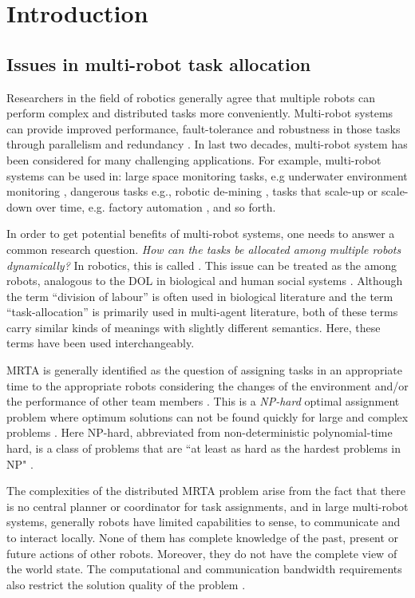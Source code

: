 \chapter{Introduction}
\label{intro}
\section{Issues in multi-robot task allocation}
\label{intro:mrta}
Researchers in the field of robotics generally agree that multiple robots can perform complex and distributed tasks more conveniently. Multi-robot systems can provide improved performance, fault-tolerance and robustness in those tasks through parallelism and redundancy \cite{Arkin1998,Parker+2006}. In last two decades, multi-robot system has been considered for many challenging applications. For example, multi-robot systems can be used in: large space monitoring tasks, e.g underwater environment monitoring \cite{Eriksen+2001}, dangerous tasks e.g., robotic de-mining \cite{Dunbar+2002}, tasks that scale-up or scale-down over time, e.g. factory automation \cite{Wurman+2008}, and so forth.

In order to get potential benefits of multi-robot systems,  one needs to answer a common research question. \textit{How can the tasks be allocated among multiple robots dynamically?} In robotics, this is called  \cite{Gerkey+2004}. This issue can be treated as the  among robots, analogous to the DOL in biological and human social systems \cite{Sendova-Franks+1999}. Although the term ``division of labour'' is often used in biological literature and the term ``task-allocation'' is primarily used in multi-agent literature, both of these terms carry similar kinds of meanings with slightly different semantics. Here, these terms have been used interchangeably.

MRTA is generally identified as the question of assigning tasks in an appropriate time to the appropriate robots considering the changes of the environment and/or the performance of other team members \cite{Gerkey+2003}. This is a {\em NP-hard} optimal assignment problem where optimum solutions can not be found quickly for large and complex problems \cite{Parker2008}. Here NP-hard, abbreviated from non-deterministic polynomial-time hard,  is a class of problems that are ``at least as hard as the hardest problems in NP" \cite{garey1979computers}.

The complexities of the distributed MRTA problem arise from the fact that there is no central planner or coordinator for task assignments, and in large multi-robot systems, generally robots have limited capabilities to sense, to communicate and to interact locally. None of them has complete knowledge of the past, present or future actions of other robots. Moreover, they do not have the complete view of the world state. The computational and communication bandwidth requirements also restrict the solution quality of the problem \cite{Gerkey+2004}.

